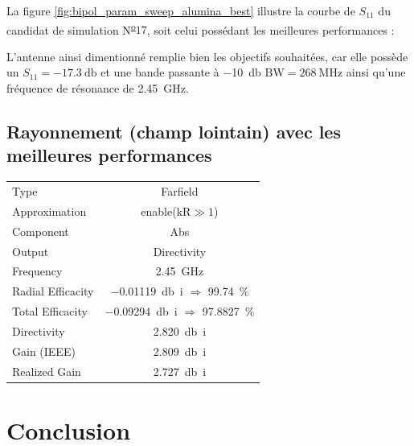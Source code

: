 \documentclass[Deriaz_Traiber_Labo02]{subfiles}
\begin{document}
\pagebreak

La figure \ref{fig:bipol_param_sweep_alumina_best} illustre la courbe de $S_{11}$ du candidat de simulation N\textsuperscript{\underline{o}}$17$, soit celui possédant les meilleures performances :


L'antenne ainsi dimentionné remplie bien les objectifs souhaitées, car elle possède un $S_{11} = \SI{-17.3}{\decibel}$ et une bande passante à \SI{-10}{\decibel} $\text{BW} = \SI{268}{\mega\hertz}$ ainsi qu'une fréquence de résonance de \SI{2.45}{\giga\hertz}.

\subsection{Rayonnement (champ lointain) avec les meilleures performances}


\begin{table}[H]
\centering
\begin{tabular}{l c}\hline
Type					& Farfield\\
Approximation		& enable($\text{kR}\gg1$)\\
Component			& Abs\\
Output				& Directivity\\
Frequency			& \SI{2.45}{\giga\hertz}\\
Radial Efficacity	& \SI{-0.01119}{\decibel i} $\Rightarrow$ \SI{99.74}{\percent}\\
Total Efficacity		& \SI{-0.09294}{\decibel i} $\Rightarrow$ \SI{97.8827}{\percent}\\
Directivity			& \SI{2.820}{\decibel i}\\
Gain	 (IEEE)			& \SI{2.809}{\decibel i}\\
Realized Gain		& \SI{2.727}{\decibel i}\\\hline
\end{tabular}
\end{table}

\pagebreak

\section{Conclusion}
\end{document}

